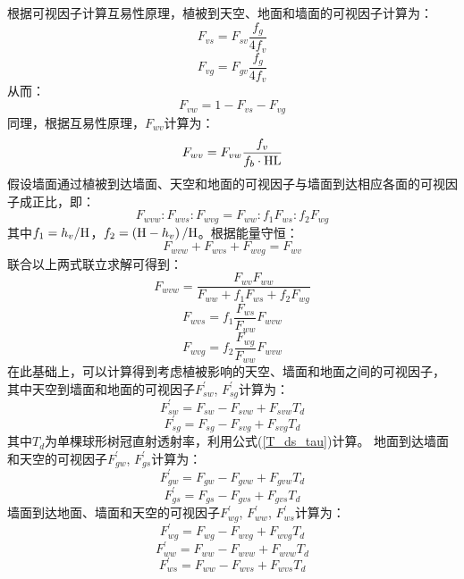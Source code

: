 根据可视因子计算互易性原理，植被到天空、地面和墙面的可视因子计算为：
\begin{equation}
F_{vs}=F_{sv} \frac{f_g}{4 f_v}
\end{equation}
\begin{equation}
F_{vg}=F_{gv} \frac{f_g}{4 f_v}
\end{equation}
从而：
\begin{equation}
F_{v w}=1-F_{v s}-F_{v g}
\end{equation}
同理，根据互易性原理，$F_{wv}$计算为：
\begin{equation}
F_{w v}=F_{v w} \frac{f_{v}}{f_{b} \cdot {\rm HL}}
\end{equation}
假设墙面通过植被到达墙面、天空和地面的可视因子与墙面到达相应各面的可视因子成正比，即：
\begin{equation}
F_{wvw}: F_{wvs}: F_{wvg}=F_{ww}: f_{1} F_{ws}: f_{2} F_{w g}
\end{equation}
其中$f_1=h_v/{\rm H}$，$f_2=\left({\rm H}-h_v\right)/{\rm H}$。根据能量守恒：
\begin{equation}
F_{wvw}+F_{wvs}+F_{wvg}=F_{w v}
\end{equation}
联合以上两式联立求解可得到：
\begin{equation}
F_{wvw}=\frac{F_{w v} F_{ww}}{F_{ww}+f_{1} F_{ws}+f_{2} F_{w g}}
\end{equation}
\begin{equation}
F_{wvs}=f_{1} \frac{F_{ws}}{F_{ww}} F_{wvw}
\end{equation}
\begin{equation}
F_{wvg}=f_{2} \frac{F_{w g}}{F_{ww}} F_{wvw}
\end{equation}
在此基础上，可以计算得到考虑植被影响的天空、墙面和地面之间的可视因子，
其中天空到墙面和地面的可视因子$F_{sw}^\prime$, $F_{sg}^\prime$计算为：
\begin{equation}
F_{sw}^{\prime}=F_{sw}-F_{svw}+F_{svw} T_{d}
\end{equation}
\begin{equation}
F_{sg}^{\prime}=F_{sg}-F_{svg}+F_{svg} T_{d}
\end{equation}
其中$T_d$为单棵球形树冠直射透射率，利用公式(\ref{T_ds_tau})计算。
地面到达墙面和天空的可视因子$F_{gw}^\prime$, $F_{gs}^\prime$计算为：
\begin{equation}
F_{gw}^{\prime}=F_{gw}-F_{gvw}+F_{gvw} T_{d}
\end{equation}
\begin{equation}
F_{gs}^{\prime}=F_{gs}-F_{gvs}+F_{gvs} T_{d}
\end{equation}
墙面到达地面、墙面和天空的可视因子$F_{wg}^\prime$, $F_{ww}^\prime$, $F_{ws}^\prime$计算为：
\begin{equation}
F_{wg}^{\prime}=F_{wg}-F_{wvg}+F_{wvg} T_{d}
\end{equation}
\begin{equation}
F_{ww}^{\prime}=F_{ww}-F_{wvw}+F_{wvw} T_{d}
\end{equation}
\begin{equation}
F_{ws}^{\prime}=F_{ww}-F_{wvs}+F_{wvs} T_{d}
\end{equation}

